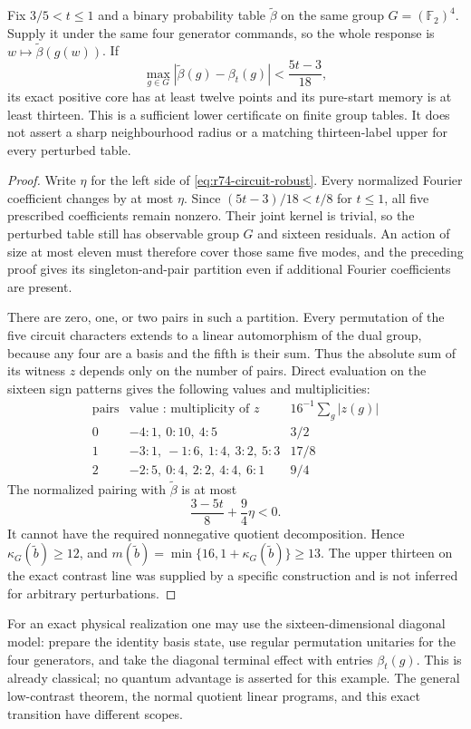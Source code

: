 \begin{corollary}
\label{cor:r74-circuit-robust}
Fix $3/5<t\le1$ and a binary probability table $\widetilde\beta$ on the
same group $G=(\mathbb F_2)^4$. Supply it under the same four generator
commands, so the whole response is $w\mapsto\widetilde\beta(g(w))$.
If
\begin{equation}\label{eq:r74-circuit-robust}
 \max_{g\in G}|\widetilde\beta(g)-\beta_t(g)|
 <\frac{5t-3}{18},
\end{equation}
its exact positive core has at least twelve points and its pure-start
memory is at least thirteen. This is a sufficient lower certificate on
finite group tables. It does not assert a sharp neighbourhood radius or a
matching thirteen-label upper for every perturbed table.
\end{corollary}
\begin{proof}
Write $\eta$ for the left side of \eqref{eq:r74-circuit-robust}.
Every normalized Fourier coefficient changes by at most $\eta$.
Since $(5t-3)/18<t/8$ for $t\le1$, all five prescribed coefficients
remain nonzero. Their joint kernel is trivial, so the perturbed table
still has observable group $G$ and sixteen residuals. An action of size
at most eleven must therefore cover those same five modes, and the
preceding proof gives its singleton-and-pair partition even if additional
Fourier coefficients are present.

There are zero, one, or two pairs in such a partition. Every permutation
of the five circuit characters extends to a linear automorphism of the
dual group, because any four are a basis and the fifth is their sum.
Thus the absolute sum of its witness $z$ depends only on the number of
pairs. Direct evaluation on the sixteen sign patterns gives the following
values and multiplicities:
\[
 \begin{array}{c|l|c}
 \text{pairs}&\text{value : multiplicity of }z
       &16^{-1}\sum_g|z(g)|\\ \hline
 0&-4:1,\ 0:10,\ 4:5&3/2\\
 1&-3:1,\ -1:6,\ 1:4,\ 3:2,\ 5:3&17/8\\
 2&-2:5,\ 0:4,\ 2:2,\ 4:4,\ 6:1&9/4
 \end{array}
\]
The normalized pairing with $\widetilde\beta$ is at most
\[
 \frac{3-5t}{8}+\frac94\eta<0.
\]
It cannot have the required nonnegative quotient decomposition. Hence
$\kappa_G(\widetilde b)\ge12$, and
$m(\widetilde b)=\min\{16,1+\kappa_G(\widetilde b)\}\ge13$.
The upper thirteen on the exact contrast line was supplied by a specific
construction and is not inferred for arbitrary perturbations.
\end{proof}

For an exact physical realization one may use the sixteen-dimensional
diagonal model: prepare the identity basis state, use regular permutation
unitaries for the four generators, and take the diagonal terminal effect
with entries $\beta_t(g)$. This is already classical; no quantum advantage
is asserted for this example. The general low-contrast theorem, the normal
quotient linear programs, and this exact transition have different scopes.

